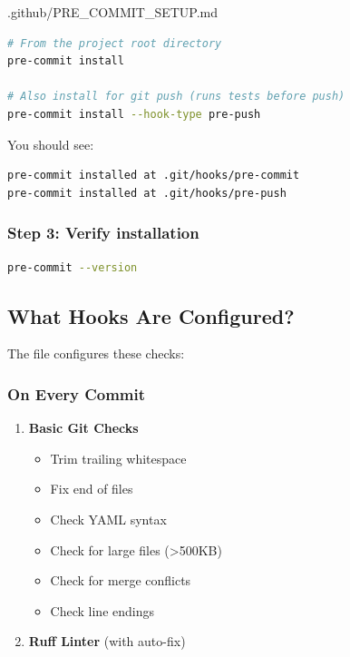 \begin{relocated}{.github/PRE_COMMIT_SETUP.md}
\begin{lstlisting}[language=bash]
# From the project root directory
pre-commit install

# Also install for git push (runs tests before push)
pre-commit install --hook-type pre-push
\end{lstlisting}

You should see:

\begin{lstlisting}[language={}]
pre-commit installed at .git/hooks/pre-commit
pre-commit installed at .git/hooks/pre-push
\end{lstlisting}

\subsubsection{Step 3: Verify installation}\label{um:flow:pre-commit-setup:step-3-verify-installation}

\begin{lstlisting}[language=bash]
pre-commit --version
\end{lstlisting}

\subsection{What Hooks Are Configured?}\label{um:flow:pre-commit-setup:what-hooks-are-configured}

The  file configures these checks:

\subsubsection{On Every Commit}\label{um:flow:pre-commit-setup:on-every-commit}

\begin{enumerate}
\def\labelenumi{\arabic{enumi}.}
\item
  \textbf{Basic Git Checks}

  \begin{itemize}
  \tightlist
  \item
    Trim trailing whitespace
  \item
    Fix end of files
  \item
    Check YAML syntax
  \item
    Check for large files (\textgreater500KB)
  \item
    Check for merge conflicts
  \item
    Check line endings
  \end{itemize}
\item
  \textbf{Ruff Linter} (with auto-fix)


\end{enumerate}
\end{relocated}
